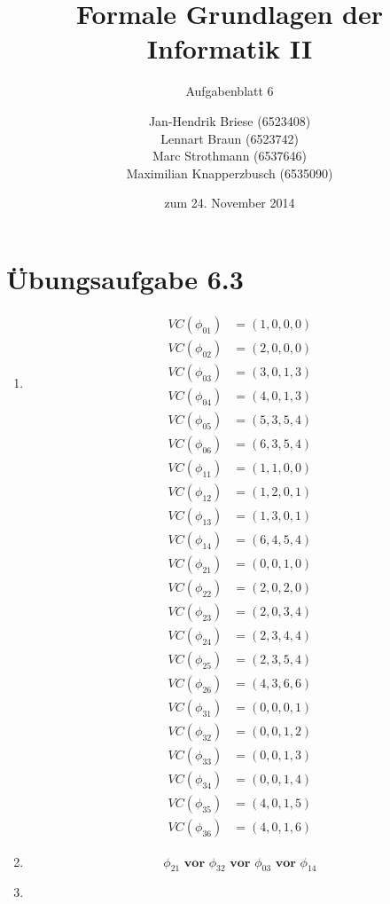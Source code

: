 \documentclass[a4paper]{scrartcl}
\title{Formale Grundlagen der Informatik II}
\subtitle{Aufgabenblatt 6}
\author{
    Jan-Hendrik Briese (6523408) \\
    Lennart Braun (6523742) \\
    Marc Strothmann (6537646) \\
    Maximilian Knapperzbusch (6535090)
}
\date{zum 24. November 2014}
\begin{document}
\maketitle

\section*{Übungsaufgabe 6.3} 
\begin{enumerate}
    \item
        \begin{align*}
            VC(\phi_{01}) &= (1, 0, 0, 0) \\
            VC(\phi_{02}) &= (2, 0, 0, 0) \\
            VC(\phi_{03}) &= (3, 0, 1, 3) \\
            VC(\phi_{04}) &= (4, 0, 1, 3) \\
            VC(\phi_{05}) &= (5, 3, 5, 4) \\
            VC(\phi_{06}) &= (6, 3, 5, 4)
        \end{align*}
        \begin{align*}
            VC(\phi_{11}) &= (1, 1, 0, 0) \\
            VC(\phi_{12}) &= (1, 2, 0, 1) \\
            VC(\phi_{13}) &= (1, 3, 0, 1) \\
            VC(\phi_{14}) &= (6, 4, 5, 4)
        \end{align*}
        \begin{align*}
            VC(\phi_{21}) &= (0, 0, 1, 0) \\
            VC(\phi_{22}) &= (2, 0, 2, 0) \\
            VC(\phi_{23}) &= (2, 0, 3, 4) \\
            VC(\phi_{24}) &= (2, 3, 4, 4) \\
            VC(\phi_{25}) &= (2, 3, 5, 4) \\
            VC(\phi_{26}) &= (4, 3, 6, 6)
        \end{align*}
        \begin{align*}
            VC(\phi_{31}) &= (0, 0, 0, 1) \\
            VC(\phi_{32}) &= (0, 0, 1, 2) \\
            VC(\phi_{33}) &= (0, 0, 1, 3) \\
            VC(\phi_{34}) &= (0, 0, 1, 4) \\
            VC(\phi_{35}) &= (4, 0, 1, 5) \\
            VC(\phi_{36}) &= (4, 0, 1, 6)
        \end{align*}

    \item
        \begin{equation*}
            \phi_{21} \textbf{ vor } \phi_{32} \textbf{ vor } \phi_{03} \textbf{ vor } \phi_{14}
        \end{equation*}

    \item

\end{enumerate}
\end{document}
